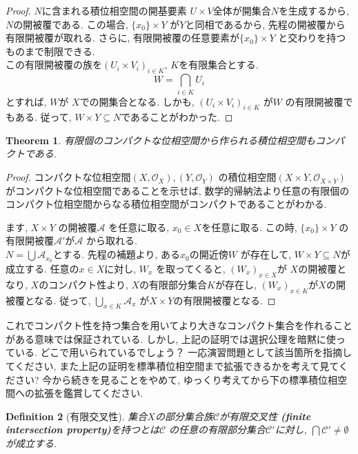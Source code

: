 \documentclass[lualatex]{ltjsbook}
\newtheorem{theorem}{Theorem}[chapter]
\newtheorem{definition}[theorem]{Definition}
\theoremstyle{remark}
\theoremstyle{plain}
\begin{document}
\begin{proof}
	$N$に含まれる積位相空間の開基要素 $ U\times V $全体が開集合$N$を生成するから,   $N$の開被覆である. この場合,   $\{x_0\} \times Y$ が$Y$と同相であるから,  先程の開被覆から有限開被覆が取れる. さらに,   有限開被覆の任意要素が$\{x_0\} \times Y $ と交わりを持つものまで制限できる. \\
	この有限開被覆の族を$\left( U_i \times V_i \right) _{i\in K}$,  $K$を有限集合とする. 
	$$
	W=\bigcap_{i \in K}U_i 
	$$
	とすれば,  $W$が $X$での開集合となる. しかも,   $\left( U_i \times V_i \right) _{i \in K}$ が$W$ の有限開被覆でもある. 従って,  $W \times Y\subseteq N$であることがわかった.
\end{proof}

\begin{theorem}
	有限個のコンパクトな位相空間から作られる積位相空間もコンパクトである.
\end{theorem}

\begin{proof}
	コンパクトな位相空間$\left( X ,  \mathcal{O}_{X} \right), \left( Y ,  \mathcal{O}_{Y} \right)$
	の積位相空間$\left( X\times Y ,  \mathcal{O}_{X\times Y} \right)$がコンパクトな位相空間であることを示せば,  数学的帰納法より任意の有限個のコンパクト位相空間からなる積位相空間がコンパクトであることがわかる.

	ます,  $X \times Y$ の開被覆$\mathcal{A}$ を任意に取る,  $x_0 \in X$を任意に取る.
	この時,  $\{x_0\} \times Y$ の有限開被覆$\mathcal{A}'$が$\mathcal{A}$ から取れる. \\
	$N = \bigcup \mathcal{A}_{x_0}$とする. 先程の補題より,  ある$x_0$の開近傍$W$ が存在して,  $W \times Y \subseteq N$が成立する.
	任意の$x \in X$に対し,  $W_{x}$ を取ってくると,  $\left( W_x \right)_{x \in X}$が $X$の開被覆となり, 
	 $X$のコンパクト性より,   $X$の有限部分集合$K$が存在し,   $\left( W_x \right) _{x \in K}$が$X$の開被覆となる.
	 従って,  $\bigcup_{x \in K} \mathcal{A}_x $ が$X \times Y$の有限開被覆となる.
\end{proof}

これでコンパクト性を持つ集合を用いてより大きなコンパクト集合を作れること
がある意味では保証されている. しかし,  上記の証明では選択公理を暗黙に使っている. どこで用いられているでしょう？
一応演習問題として該当箇所を指摘してください,  また上記の証明を標準積位相空間まで拡張できるかを考えて見てください? 今から続きを見ることをやめて,  ゆっくり考えてから下の標準積位相空間への拡張を鑑賞してください.

\begin{definition}[有限交叉性]
	集合$X$の部分集合族$\mathcal{C}$が有限交叉性 
	\textbf{(finite intersection property)}を持つとは$\mathcal{C}$ 
	の任意の有限部分集合$\mathcal{C}'$に対し,  $\bigcap \mathcal{C}' \neq \emptyset$ が成立する.
\end{definition}
\end{document}
